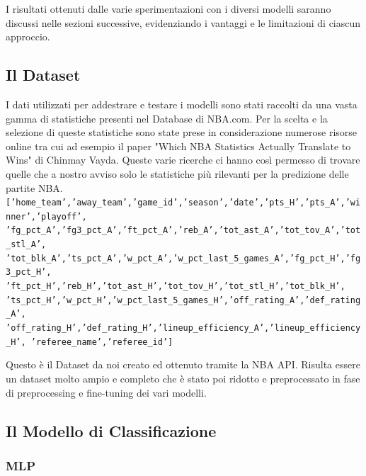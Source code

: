 I risultati ottenuti dalle varie sperimentazioni con i diversi modelli saranno discussi nelle sezioni successive, evidenziando i vantaggi e le limitazioni di ciascun approccio.

\subsection{Il Dataset}

I dati utilizzati per addestrare e testare i modelli sono stati raccolti da una vasta gamma di statistiche presenti nel Database di NBA.com. Per la scelta e la selezione di queste statistiche sono state prese in considerazione numerose risorse online tra cui ad esempio il paper "Which NBA Statistics Actually Translate to Wins" di Chinmay Vayda. Queste varie ricerche ci hanno così permesso di trovare quelle che a nostro avviso solo le statistiche più rilevanti per la predizione delle partite NBA.\newline
\texttt{['home\_team','away\_team','game\_id','season','date','pts\_H','pts\_A','winner','playoff', \newline
'fg\_pct\_A','fg3\_pct\_A','ft\_pct\_A','reb\_A','tot\_ast\_A','tot\_tov\_A','tot\_stl\_A',\newline
'tot\_blk\_A','ts\_pct\_A','w\_pct\_A','w\_pct\_last\_5\_games\_A','fg\_pct\_H','fg3\_pct\_H',\newline
'ft\_pct\_H','reb\_H','tot\_ast\_H','tot\_tov\_H','tot\_stl\_H','tot\_blk\_H', \newline
'ts\_pct\_H','w\_pct\_H','w\_pct\_last\_5\_games\_H','off\_rating\_A','def\_rating\_A',\newline
'off\_rating\_H','def\_rating\_H','lineup\_efficiency\_A','lineup\_efficiency\_H',\newline
'referee\_name','referee\_id']}

Questo è il Dataset da noi creato ed ottenuto tramite la NBA API. Risulta essere un dataset molto ampio e completo che è stato poi ridotto e preprocessato in fase di preprocessing e fine-tuning dei vari modelli.

\subsection{Il Modello di Classificazione}

\subsubsection{MLP}

